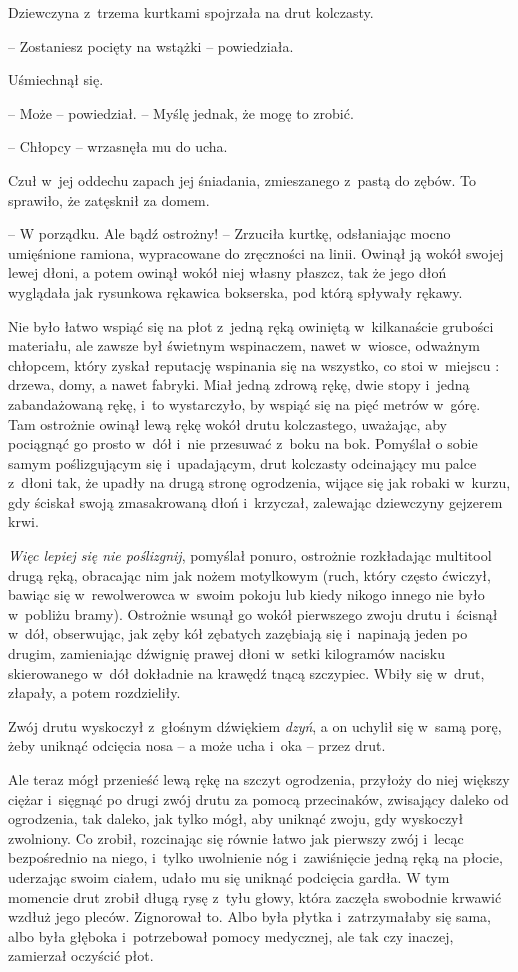 \documentclass[oneside,polish,11pt,rmheadings]{mwbk}
\begin{document}
Dziewczyna z~trzema kurtkami spojrzała na drut kolczasty. 

-- Zostaniesz pocięty na wstążki -- powiedziała. 


Uśmiechnął się. 

-- Może -- powiedział. -- Myślę jednak, że mogę to zrobić. 


-- Chłopcy -- wrzasnęła mu do ucha. 

Czuł w~jej oddechu zapach jej śniadania, zmieszanego z~pastą do zębów. To sprawiło, że zatęsknił za domem. 

-- W porządku. Ale bądź ostrożny! -- Zrzuciła kurtkę, odsłaniając mocno umięśnione ramiona, wypracowane do zręczności na linii. Owinął ją wokół swojej lewej dłoni, a potem owinął wokół niej własny płaszcz, tak że jego dłoń wyglądała jak rysunkowa rękawica bokserska, pod którą spływały rękawy. 


Nie było łatwo wspiąć się na płot z~jedną ręką owiniętą w~kilkanaście grubości materiału, ale zawsze był świetnym wspinaczem, nawet w~wiosce, odważnym chłopcem, który zyskał reputację wspinania się na wszystko, co stoi w~miejscu : drzewa, domy, a nawet fabryki. Miał jedną zdrową rękę, dwie stopy i~jedną zabandażowaną rękę, i~to wystarczyło, by wspiąć się na pięć metrów w~górę. Tam ostrożnie owinął lewą rękę wokół drutu kolczastego, uważając, aby pociągnąć go prosto w~dół i~nie przesuwać z~boku na bok. Pomyślał o sobie samym poślizgującym się i~upadającym, drut kolczasty odcinający mu palce z~dłoni tak, że upadły na drugą stronę ogrodzenia, wijące się jak robaki w~kurzu, gdy ściskał swoją zmasakrowaną dłoń i~krzyczał, zalewając dziewczyny gejzerem krwi. 


\textit{Więc lepiej się nie poślizgnij}, pomyślał ponuro, ostrożnie rozkładając multitool drugą ręką, obracając nim jak nożem motylkowym (ruch, który często ćwiczył, bawiąc się w~rewolwerowca w~swoim pokoju lub kiedy nikogo innego nie było w~pobliżu bramy). Ostrożnie wsunął go wokół pierwszego zwoju drutu i~ścisnął w~dół, obserwując, jak zęby kół zębatych zazębiają się i~napinają jeden po drugim, zamieniając dźwignię prawej dłoni w~setki kilogramów nacisku skierowanego w~dół dokładnie na krawędź tnącą szczypiec. Wbiły się w~drut, złapały, a potem rozdzieliły. 


Zwój drutu wyskoczył z~głośnym dźwiękiem \textit{dzyń}, a on uchylił się w~samą porę, żeby uniknąć odcięcia nosa -- a może ucha i~oka -- przez drut. 


Ale teraz mógł przenieść lewą rękę na szczyt ogrodzenia, przyłoży do niej większy ciężar i~sięgnąć po drugi zwój drutu za pomocą przecinaków, zwisający daleko od ogrodzenia, tak daleko, jak tylko mógł, aby uniknąć zwoju, gdy wyskoczył zwolniony. Co zrobił, rozcinając się równie łatwo jak pierwszy zwój i~lecąc bezpośrednio na niego, i~tylko uwolnienie nóg i~zawiśnięcie jedną ręką na płocie, uderzając swoim ciałem, udało mu się uniknąć podcięcia gardła. W tym momencie drut zrobił długą rysę z~tyłu głowy, która zaczęła swobodnie krwawić wzdłuż jego pleców. Zignorował to. Albo była płytka i~zatrzymałaby się sama, albo była głęboka i~potrzebował pomocy medycznej, ale tak czy inaczej, zamierzał oczyścić płot. 
\end{document}
